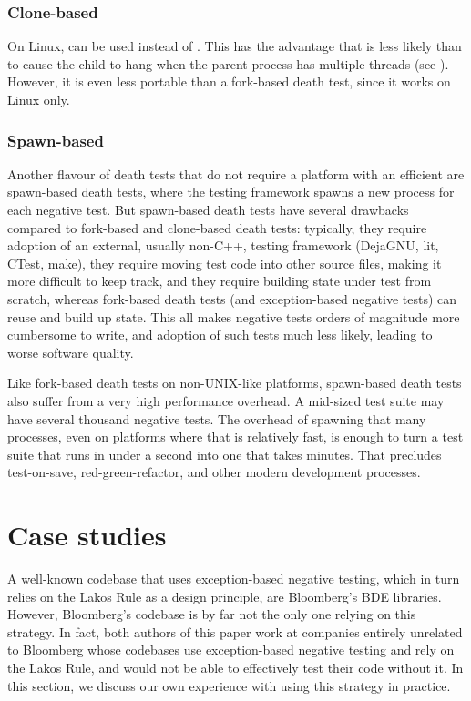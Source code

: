 \subsubsection{Clone-based}

On Linux,  can be used instead of . This has the advantage that  is less likely than  to cause the child to hang when the parent process has multiple threads (see \cite{GTestDocDeathTests}). However, it is even less portable than a fork-based death test, since it works on Linux only.

\subsubsection{Spawn-based}

Another flavour of death tests that do not require a platform with an efficient  are spawn-based death tests, where the testing framework spawns a new process for each negative test. But spawn-based death tests have several drawbacks compared to fork-based and clone-based death tests: typically, they require adoption of an external, usually non-C++, testing framework (DejaGNU, lit, CTest, make), they require moving test code into other source files, making it more difficult to keep track, and they require building state under test from scratch, whereas fork-based death tests (and exception-based negative tests) can reuse and build up state. This all makes negative tests orders of magnitude more cumbersome to write, and adoption of such tests much less likely, leading to worse software quality.

Like fork-based death tests on non-UNIX-like platforms, spawn-based death tests also suffer from a very high performance overhead. A mid-sized test suite may have several thousand negative tests. The overhead of spawning that many processes, even on platforms where that is relatively fast, is enough to turn a test suite that runs in under a second into one that takes minutes. That precludes test-on-save, red-green-refactor, and other modern development processes.

\section{Case studies}
\label{sec:casestudies}

A well-known codebase that uses exception-based negative testing, which in turn relies on the Lakos Rule as a design principle, are Bloomberg's BDE libraries. However, Bloomberg's codebase is by far not the only one relying on this strategy. In fact, both authors of this paper work at companies entirely unrelated to Bloomberg whose codebases use exception-based negative testing and rely on the Lakos Rule, and would not be able to effectively test their code without it. In this section, we discuss our own experience with using this strategy in practice.

